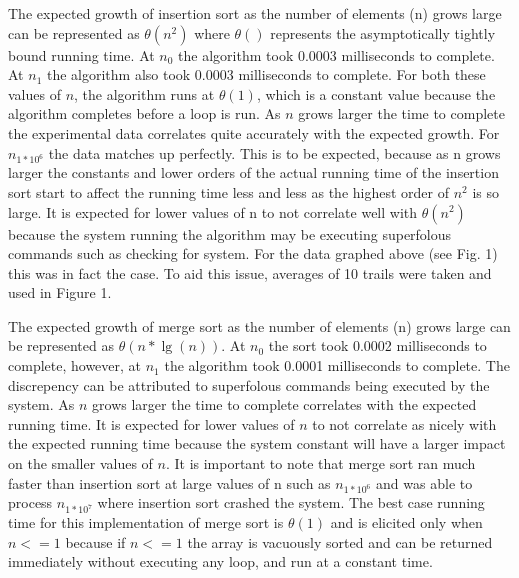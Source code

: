 \documentclass[onecolumn, 12pt, article]{IEEEtran}
\numberwithin{case}{problem}
\numberwithin{condition}{problem}
\numberwithin{condition}{subsection}
\numberwithin{definition}{section}
\theoremstyle{remark}
\numberwithin{question}{problem}
\theoremstyle{plain}
\numberwithin{answer}{problem}
\numberwithin{solution}{section}
\numberwithin{equation}{section}%
\begin{document}
The expected growth of insertion sort as the number of elements (n) grows large can be represented as $ \theta(n^2) $ where $ \theta() $ represents the asymptotically tightly bound running time. \cite{textbook} At $n_0$ the algorithm took 0.0003 milliseconds to complete. At $n_1$ the algorithm also took 0.0003 milliseconds to complete. For both these values of $n$, the algorithm runs at $ \theta(1) $, which is a constant value because the algorithm completes before a loop is run. As $n$ grows larger the time to complete the experimental data correlates quite accurately with the expected growth. For $n_{1*10^6} $ the data matches up perfectly. This is to be expected, because as n grows larger the constants and lower orders of the actual running time of the insertion sort start to affect the running time less and less as the highest order of $n^2$ is so large. It is expected for lower values of n to not correlate well with $ \theta(n^2) $ because the system running the algorithm may be executing superfolous commands such as checking for system. For the data graphed above (see Fig. 1) this was in fact the case. To aid this issue, averages of 10 trails were taken and used in Figure 1.

The expected growth of merge sort as the number of elements (n) grows large can be represented as $ \theta(n*\lg(n)) $. At $n_0$ the sort took 0.0002 milliseconds to complete, however, at $n_1$ the algorithm took 0.0001 milliseconds to complete. The discrepency can be attributed to superfolous commands being executed by the system. As $n$ grows larger the time to complete correlates with the expected running time. It is expected for lower values of $n$ to not correlate as nicely with the expected running time because the system constant will have a larger impact on the smaller values of $n$. It is important to note that merge sort ran much faster than insertion sort at large values of n such as $n_{1*10^6} $ and was able to process $n_{1*10^7} $ where insertion sort crashed the system. The best case running time for this implementation of merge sort is $ \theta(1) $ and is elicited only when $ n <= 1 $ because if $n <= 1$ the array is vacuously sorted and can be returned immediately without executing any loop, and run at a constant time.
\end{document}
